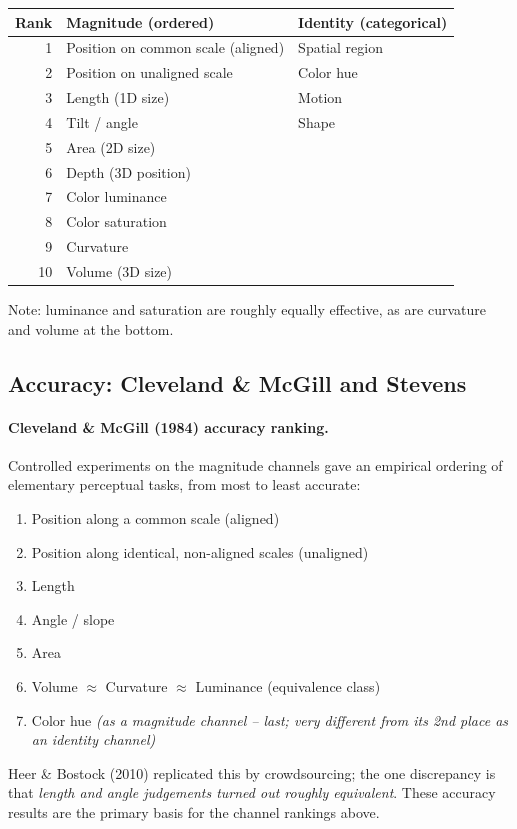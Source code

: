\begin{center}
\begin{tabular}{@{}r l l@{}}
\toprule
Rank & \textbf{Magnitude (ordered)} & \textbf{Identity (categorical)} \\
\midrule
1 & Position on common scale (aligned) & Spatial region \\
2 & Position on unaligned scale        & Color hue \\
3 & Length (1D size)                   & Motion \\
4 & Tilt / angle                       & Shape \\
5 & Area (2D size)                     & \\
6 & Depth (3D position)                & \\
7 & Color luminance                    & \\
8 & Color saturation                   & \\
9 & Curvature                          & \\
10 & Volume (3D size)                  & \\
\bottomrule
\end{tabular}
\end{center}

\noindent Note: luminance and saturation are roughly equally effective, as are
curvature and volume at the bottom.

\subsection{Accuracy: Cleveland \& McGill and Stevens}

\paragraph{Cleveland \& McGill (1984) accuracy ranking.} Controlled experiments
on the magnitude channels gave an empirical ordering of elementary perceptual
tasks, from most to least accurate:
\begin{enumerate}[label=\arabic*.]
  \item Position along a common scale (aligned)
  \item Position along identical, non-aligned scales (unaligned)
  \item Length
  \item Angle / slope
  \item Area
  \item Volume $\approx$ Curvature $\approx$ Luminance (equivalence class)
  \item Color hue \emph{(as a magnitude channel -- last; very different from its
        2nd place as an identity channel)}
\end{enumerate}
Heer \& Bostock (2010) replicated this by crowdsourcing; the one discrepancy is
that \emph{length and angle judgements turned out roughly equivalent}. These
accuracy results are the primary basis for the channel rankings above.

